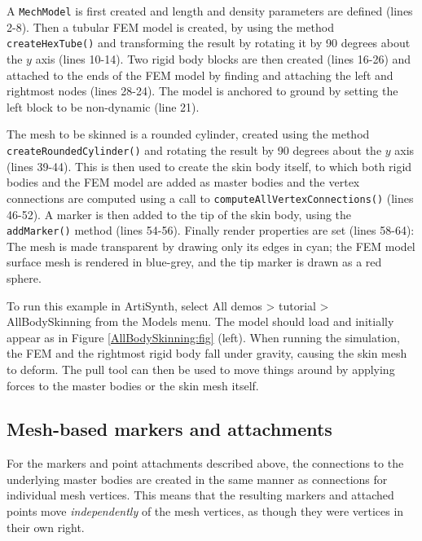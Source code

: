 A {\tt MechModel} is first created and length and density parameters
are defined (lines 2-8). Then a tubular FEM model is created, by using
the  method {\tt
createHexTube()} and transforming the result by rotating it by 90
degrees about the $y$ axis (lines 10-14). Two rigid body blocks are
then created (lines 16-26) and attached to the ends of the FEM model
by finding and attaching the left and rightmost nodes (lines 28-24).
The model is anchored to ground by setting the left block to be
non-dynamic (line 21).

The mesh to be skinned is a rounded cylinder, created using the
 method {\tt
createRoundedCylinder()} and rotating the result by 90 degrees about
the $y$ axis (lines 39-44). This is then used to create the skin body
itself, to which both rigid bodies and the FEM model are added as
master bodies and the vertex connections are computed using a call to
{\tt computeAllVertexConnections()} (lines 46-52). A marker is then
added to the tip of the skin body, using the {\tt addMarker()} method
(lines 54-56). Finally render properties are set (lines 58-64):
The mesh is made transparent by drawing only its edges in cyan; the
FEM model surface mesh is rendered in blue-grey, and the
tip marker is drawn as a red sphere.

To run this example in ArtiSynth, select {\sf All demos > tutorial >
AllBodySkinning} from the {\sf Models} menu. The model should load and
initially appear as in Figure \ref{AllBodySkinning:fig} (left). When
running the simulation, the FEM and the rightmost rigid body fall
under gravity, causing the skin mesh to deform. The pull tool
can then be used to move things around by applying forces to the
master bodies or the skin mesh itself.

\subsection{Mesh-based markers and attachments}

For the markers and point attachments described above, the connections
to the underlying master bodies are created in the same manner as
connections for individual mesh vertices. This means that the
resulting markers and attached points move {\it independently} of the
mesh vertices, as though they were vertices in their own right.

